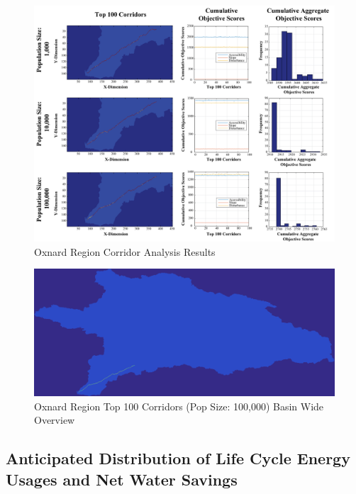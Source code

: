         \begin{figure}[!h]
            \begin{center}
            \includegraphics[width=6in]{figures/Oxnard_PathwayResults.png}   
            \caption{Oxnard Region Corridor Analysis Results}
            \label{fig:Oresults}
            \end{center}
        \end{figure}

        \begin{figure}[!h]
            \begin{center}
            \includegraphics[width=5.5in]{figures/Oxnard_PathwayLarge.png}   
            \caption{Oxnard Region Top 100 Corridors (Pop Size: 100,000) Basin Wide Overview}
            \label{fig:OsolutionOverview}
            \end{center}
        \end{figure}
    
    \subsection{Anticipated Distribution of Life Cycle Energy Usages and Net Water Savings}    
        
